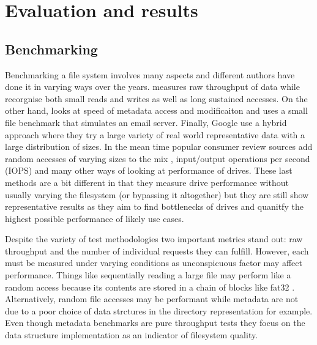\chapter{Evaluation and results}

    \section{Benchmarking}
        \label{sec_benchmark}

        Benchmarking a file system involves many aspects and different authors
        have done it in varying ways over the years. \citeauthor{FFS} measures
        raw throughput of data while \citeauthor{LFS} recorgnise both small
        reads and writes as well as long sustained accesses.  On the other
        hand, \citeauthor{soft_updates} looks at speed of metadata access and
        modificaiton and \citeauthor{ext4_space_maps} uses a small file
        benchmark that simulates an email server. Finally, Google use a hybrid
        approach where they try a large variety of real world representative
        data with a large distribution of sizes. In the mean time popular
        consumer review sources add random accesses of varying sizes to the mix
        \cite{servethehome_review}, input/output operations per second (IOPS)
        \cite{tomshardware_review} and many other ways of looking at
        performance of drives. These last methods are a bit different in that
        they measure drive performance without usually varying the filesystem
        (or bypassing it altogether) but they are still show representative
        results as they aim to find bottlenecks of drives and quanitfy the
        highest possible performance of likely use cases.

        Despite the variety of test methodologies two important metrics stand
        out: raw throughput and the number of individual requests they can
        fulfill. However, each must be measured under varying conditions as
        unconspicuous factor may affect performance. Things like sequentially
        reading a large file may perform like a random access because its
        contents are stored in a chain of blocks like fat32 \cite{fat32}.
        Alternatively, random file accesses may be performant while metadata
        are not due to a poor choice of data strctures in the directory
        representation for example. Even though metadata benchmarks are pure
        throughput tests they focus on the data structure implementation as an
        indicator of filesystem quality.

